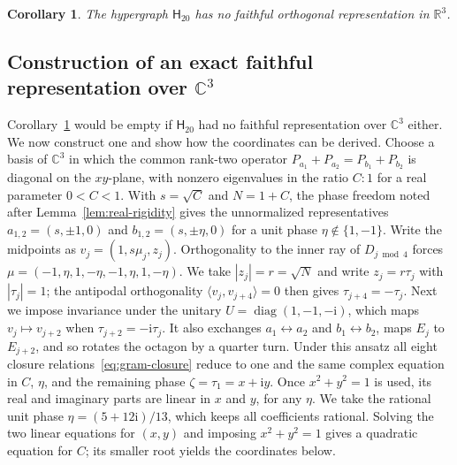 \documentclass[twocolumn,aps,pra,floatfix,amsmath,amssymb,longbibliography]{revtex4-2}
\newenvironment{handrewrite}{\leavevmode\color{blue}}{}
\newtheorem{corollary}[theorem]{Corollary}
\theoremstyle{definition}
\theoremstyle{remark}
\newcommand{\ii}{\mathrm{i}}
\newcommand{\C}{\mathbb C}
\newcommand{\R}{\mathbb R}
\newcommand{\Htwenty}{\mathsf H_{20}}
\begin{document}
\begin{corollary}
\label{cor:h20-real}
The hypergraph $\Htwenty$ has no faithful orthogonal representation in
$\R^3$.
\end{corollary}

\subsection{Construction of an exact faithful representation over
\texorpdfstring{$\C^3$}{C3}}

\begin{handrewrite}
Corollary~\ref{cor:h20-real} would be empty if $\Htwenty$ had no faithful
representation over $\C^3$ either.  We now construct one and show how the
coordinates can be derived.  Choose a basis of $\C^3$ in which
the common rank-two operator $P_{a_1}+P_{a_2}=P_{b_1}+P_{b_2}$ is diagonal
on the $xy$-plane, with nonzero eigenvalues in the ratio $C:1$ for a real
parameter $0<C<1$.  With $s=\sqrt C$ and $N=1+C$, the phase freedom noted
after Lemma~\ref{lem:real-rigidity} gives the unnormalized representatives
$a_{1,2}=(s,\pm1,0)$ and $b_{1,2}=(s,\pm\eta,0)$ for a unit phase
$\eta\notin\{1,-1\}$.  Write the midpoints as $v_j=(1,s\mu_j,z_j)$.
Orthogonality to the inner ray of $D_{j\bmod4}$ forces
$\mu=(-1,\eta,1,-\eta,-1,\eta,1,-\eta)$.  We take $|z_j|=r=\sqrt N$ and
write $z_j=r\tau_j$ with $|\tau_j|=1$; the antipodal orthogonality
$\langle v_j,v_{j+4}\rangle=0$ then gives $\tau_{j+4}=-\tau_j$.  Next we
impose invariance under the unitary $U=\operatorname{diag}(1,-1,-\ii)$, which
maps $v_j\mapsto v_{j+2}$ when $\tau_{j+2}=-\ii\tau_j$.  It also exchanges
$a_1\leftrightarrow a_2$ and $b_1\leftrightarrow b_2$, maps $E_j$ to
$E_{j+2}$, and so rotates the octagon by a quarter turn.  Under this ansatz
all eight closure relations~\eqref{eq:gram-closure} reduce to one and the
same complex equation in $C$, $\eta$, and the remaining phase
$\zeta=\tau_1=x+\ii y$.  Once $x^2+y^2=1$ is used, its real and imaginary
parts are linear in $x$ and $y$, for any $\eta$.  We take the rational unit
phase $\eta=(5+12\ii)/13$, which keeps all coefficients rational.  Solving
the two linear equations for $(x,y)$ and imposing $x^2+y^2=1$ gives a
quadratic equation for $C$; its smaller root yields the coordinates below.
\end{handrewrite}
\end{document}
